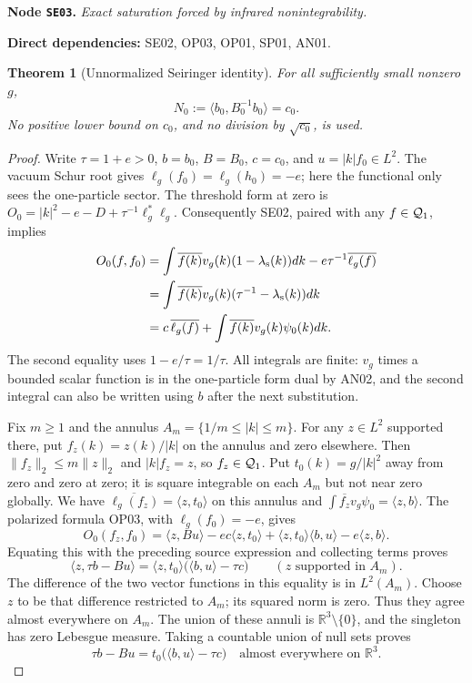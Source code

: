 \documentclass[11pt,a4paper]{article}
\newtheorem{theorem}{Theorem}[section]
\theoremstyle{remark}\newtheorem{remark}[theorem]{Remark}
\newcommand{\R}{\mathbb R}\newcommand{\C}{\mathbb C}\newcommand{\N}{\mathbb N}
\newcommand{\node}[3]{\par\Needspace{6\baselineskip}\smallskip\hypertarget{node:#1}{}\label{nodepage:#1}\noindent\textbf{Node \texttt{#1}.} \textit{#2.}\par\noindent\textbf{Direct dependencies:} #3.\par}
\begin{document}
\node{SE03}{Exact saturation forced by infrared nonintegrability}{SE02, OP03, OP01, SP01, AN01}
\begin{theorem}[Unnormalized Seiringer identity]\label{thm:saturation}\label{lem:saturation}
For all sufficiently small nonzero $g$,
\begin{equation}
 N_0:=\langle b_0,B_0^{-1}b_0\rangle=c_0.
 \label{eq:saturation}
\end{equation}
No positive lower bound on $c_0$, and no division by $\sqrt{c_0}$, is used.
\end{theorem}
\begin{proof}
Write $\tau=1+e>0$, $b=b_0$, $B=B_0$, $c=c_0$, and $u=|k|f_0\in L^2$. The vacuum Schur root gives
$\ell_g(f_0)=\ell_g(h_0)=-e$; here the functional only sees the one-particle sector. The threshold form at zero is
$O_0=|k|^2-e-D+\tau^{-1}\ell_g^*\ell_g$.
Consequently SE02, paired with any $f\in\mathcal Q_1$, implies
\begin{align*}
 O_0(f,f_0)
 &=\int\overline{f(k)}v_g(k)(1-\lambda_{\rm s}(k))dk
       -e\tau^{-1}\overline{\ell_g(f)}\\
 &=\int\overline{f(k)}v_g(k)(\tau^{-1}-\lambda_{\rm s}(k))dk\\
 &=c\,\overline{\ell_g(f)}+\int\overline{f(k)}v_g(k)\psi_0(k)dk.
\end{align*}
The second equality uses $1-e/\tau=1/\tau$. All integrals are finite: $v_g$ times a bounded scalar function is in the one-particle form dual by AN02, and the second integral can also be written using $b$ after the next substitution.

Fix $m\geq1$ and the annulus $A_m=\{1/m\leq|k|\leq m\}$. For any $z\in L^2$ supported there, put $f_z(k)=z(k)/|k|$ on the annulus and zero elsewhere. Then $\|f_z\|_2\leq m\|z\|_2$ and $|k|f_z=z$, so $f_z\in\mathcal Q_1$. Put $t_0(k)=g/|k|^2$ away from zero and zero at zero; it is square integrable on each $A_m$ but not near zero globally. We have
$\overline{\ell_g(f_z)}=\langle z,t_0\rangle$ on this annulus and
$\int\overline{f_z}v_g\psi_0=\langle z,b\rangle$.
The polarized formula OP03, with $\ell_g(f_0)=-e$, gives
\[
 O_0(f_z,f_0)=\langle z,Bu\rangle
       -ec\langle z,t_0\rangle
       +\langle z,t_0\rangle\langle b,u\rangle
       -e\langle z,b\rangle.
\]
Equating this with the preceding source expression and collecting terms proves
\[
 \langle z,\tau b-Bu\rangle
  =\langle z,t_0\rangle\bigl(\langle b,u\rangle-\tau c\bigr)
 \qquad(z\text{ supported in }A_m).
\]
The difference of the two vector functions in this equality is in $L^2(A_m)$. Choose $z$ to be that difference restricted to $A_m$; its squared norm is zero. Thus they agree almost everywhere on $A_m$. The union of these annuli is $\R^3\setminus\{0\}$, and the singleton has zero Lebesgue measure. Taking a countable union of null sets proves
\begin{equation}
 \tau b-Bu=t_0\bigl(\langle b,u\rangle-\tau c\bigr)
 \quad\text{almost everywhere on }\R^3.
 \label{eq:infraredcancel}
\end{equation}


\end{proof}
\end{document}
